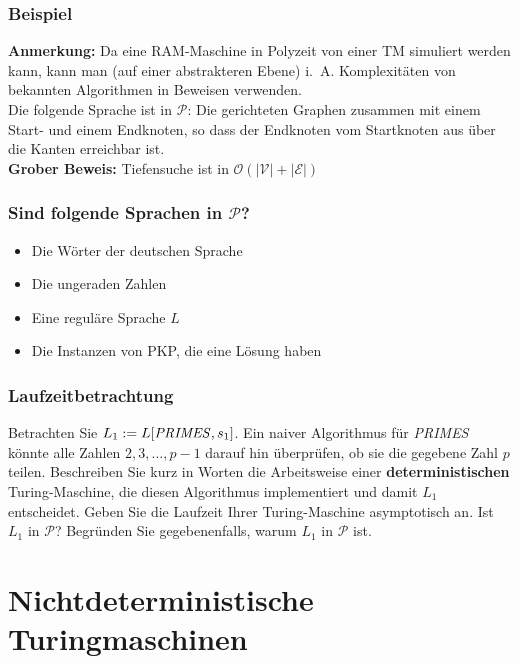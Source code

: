 \begin{frame}
\frametitle{Beispiel}
\textbf{Anmerkung:} Da eine RAM-Maschine in Polyzeit von einer TM simuliert werden kann, kann man (auf einer abstrakteren Ebene) i.~A. Komplexitäten von bekannten Algorithmen in Beweisen verwenden.\\[10pt]
Die folgende Sprache ist in $\mathcal{P}$: Die gerichteten Graphen zusammen mit einem Start- und einem Endknoten, so dass der Endknoten vom Startknoten aus über die Kanten erreichbar ist.\\[6pt]
\textbf{Grober Beweis:}	Tiefensuche ist in $\mathcal{O}(|\mathcal{V}| + |\mathcal{E}|)$
\end{frame}

\begin{frame}
\frametitle{Sind folgende Sprachen in $\mathcal{P}$?}
\begin{itemize}
\item Die Wörter der deutschen Sprache
\item Die ungeraden Zahlen
\item Eine reguläre Sprache $L$
\item Die Instanzen von PKP, die eine Lösung haben
\end{itemize}
\end{frame}

\begin{frame}
 \frametitle{Laufzeitbetrachtung}
 Betrachten Sie $L_1 := L[\text{\textit{PRIMES}},s_1]$. 
Ein naiver Algorithmus für \textit{PRIMES} könnte alle Zahlen $2,3,\ldots,p-1$ darauf hin überprüfen, ob sie die gegebene Zahl $p$ teilen. 
Beschreiben Sie kurz in Worten die Arbeitsweise einer \textbf{deterministischen} Turing-Maschine, die diesen Algorithmus implementiert und damit $L_1$ entscheidet. 
Geben Sie die Laufzeit Ihrer Turing-Maschine asymptotisch an. Ist $L_1$ in $\mathcal{P}$? Begründen Sie gegebenenfalls, warum $L_1$ in $\mathcal{P}$ ist.
\end{frame}

\section{Nichtdeterministische Turingmaschinen}
